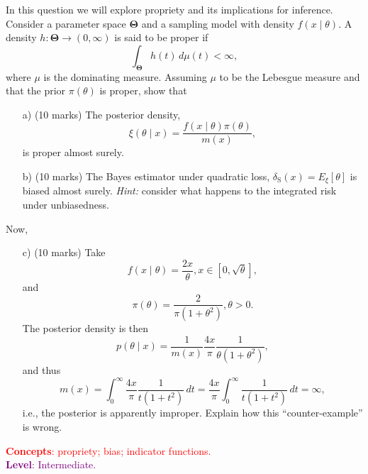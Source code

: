 \documentclass[a4paper,10pt, notitlepage]{report}
\begin{document}
In this question we will explore propriety and its implications for inference.
Consider a parameter space $\boldsymbol{\Theta}$ and a sampling model with density $f(x \mid \theta)$.
A density $h : \boldsymbol{\Theta} \to (0, \infty)$ is said to be proper if 
\begin{equation*}
 \int_{\boldsymbol{\Theta}} h(t)\,d\mu(t)  < \infty,
\end{equation*}
where $\mu$ is the dominating measure.
Assuming $\mu$ to be the Lebesgue measure and that the prior $\pi(\theta)$ is proper, show that
\begin{itemize}
 \item[a)] (10 marks) The posterior density,
 \begin{equation*}
  \xi(\theta \mid x) = \frac{f(x\mid \theta)\pi(\theta)}{m(x)},
 \end{equation*}
is proper almost surely.
\item[b)] (10 marks) The Bayes estimator under quadratic loss, $\delta_{\text{S}}(x) = E_\xi[\theta]$ is biased almost surely.
\textit{Hint:} consider what happens to the integrated risk under unbiasedness.
\end{itemize}
Now,
\begin{itemize}
 \item[c)] (10 marks) Take
$$f(x \mid \theta) = \frac{2x}{\theta}, x \in [0, \sqrt{\theta}],$$
and 
$$ \pi(\theta) = \frac{2}{\pi (1 +\theta^2)}, \theta > 0.$$
The posterior density is then
\begin{equation*}
 p(\theta \mid x) = \frac{1}{m(x)} \frac{4x}{\pi}\frac{1}{\theta(1 +\theta^2)},
\end{equation*}
 and thus
\begin{equation*}
 m(x) = \int_{0}^\infty \frac{4x}{\pi} \frac{1}{t(1 +t^2)}\,dt = \frac{4x}{\pi} \int_{0}^\infty \frac{1}{t(1 +t^2)}\,dt = \infty,
\end{equation*}
i.e., the posterior is apparently improper.
Explain how this ``counter-example'' is wrong.
\end{itemize}
\textcolor{red}{\textbf{Concepts}: propriety; bias; indicator functions.}\\ \textcolor{purple}{\textbf{Level}: Intermediate.}\\
\end{document}
